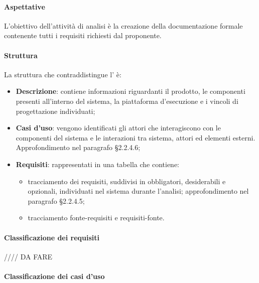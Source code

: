 \paragraph{Aspettative}

L'obiettivo dell'attività di analisi è la creazione della documentazione formale contenente tutti i requisiti richiesti dal proponente.

\paragraph{Struttura}

La struttura che contraddistingue l'\AdR{} è:
\begin{itemize}

\item \textbf{Descrizione}: contiene informazioni riguardanti il prodotto,  le componenti presenti all'interno del sistema,  la piattaforma d'esecuzione e i vincoli di progettazione individuati;

\item \textbf{Casi d'uso}: vengono identificati gli attori che interagiscono con le componenti del sistema e le interazioni tra sistema,  attori ed elementi esterni.  Approfondimento nel paragrafo §2.2.4.6;
\item \textbf{Requisiti}: rappresentati in una tabella che contiene:
 \begin{itemize}
 
 \item tracciamento dei requisiti,  suddivisi in obbligatori,  desiderabili e opzionali,  individuati nel sistema durante l'analisi; approfondimento nel paragrafo §2.2.4.5;
 
 \item tracciamento fonte-requisiti e requisiti-fonte.
 
 \end{itemize}

\end{itemize}

\paragraph{Classificazione dei requisiti}

//// DA FARE

\paragraph{Classificazione dei casi d'uso}


